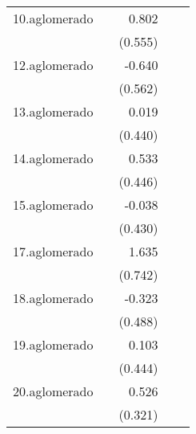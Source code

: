 {\begin{longtable}{l*{4}{D{.}{.}{-1}}}
\addlinespace
10.aglomerado&                     &       0.802         &                     &                     \\
            &                     &     (0.555)         &                     &                     \\
\addlinespace
12.aglomerado&                     &      -0.640         &                     &                     \\
            &                     &     (0.562)         &                     &                     \\
\addlinespace
13.aglomerado&                     &       0.019         &                     &                     \\
            &                     &     (0.440)         &                     &                     \\
\addlinespace
14.aglomerado&                     &       0.533         &                     &                     \\
            &                     &     (0.446)         &                     &                     \\
\addlinespace
15.aglomerado&                     &      -0.038         &                     &                     \\
            &                     &     (0.430)         &                     &                     \\
\addlinespace
17.aglomerado&                     &       1.635\sym{*}  &                     &                     \\
            &                     &     (0.742)         &                     &                     \\
\addlinespace
18.aglomerado&                     &      -0.323         &                     &                     \\
            &                     &     (0.488)         &                     &                     \\
\addlinespace
19.aglomerado&                     &       0.103         &                     &                     \\
            &                     &     (0.444)         &                     &                     \\
\addlinespace
20.aglomerado&                     &       0.526         &                     &                     \\
            &                     &     (0.321)         &                     &                     \\

\end{longtable}}
